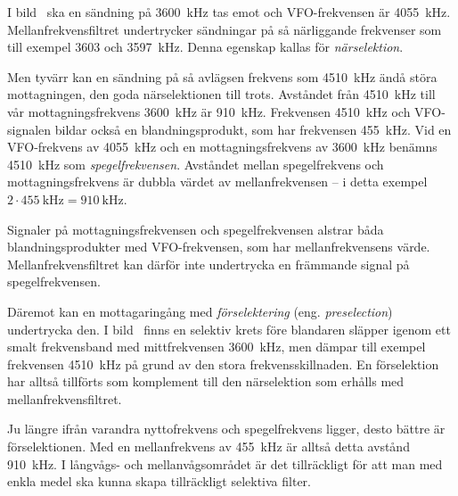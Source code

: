 \begin{exempelbox}
I bild~ ska en sändning på \qty{3600}{\kilo\hertz} tas
emot och VFO-frekvensen är \qty{4055}{\kilo\hertz}.
Mellanfrekvensfiltret undertrycker sändningar på så närliggande frekvenser
som till exempel 3603 och \qty{3597}{\kilo\hertz}.
Denna egenskap kallas för \emph{närselektion}.

Men tyvärr kan en sändning på så avlägsen frekvens som \qty{4510}{\kilo\hertz}
ändå störa mottagningen, den goda närselektionen till trots.
Avståndet från \qty{4510}{\kilo\hertz} till vår mottagningsfrekvens
\qty{3600}{\kilo\hertz} är \qty{910}{\kilo\hertz}.
Frekvensen \qty{4510}{\kilo\hertz} och VFO-signalen bildar också en
blandningsprodukt, som har frekvensen \qty{455}{\kilo\hertz}.
Vid en VFO-frekvens av \qty{4055}{\kilo\hertz} och en mottagningsfrekvens av
\qty{3600}{\kilo\hertz} benämns \qty{4510}{\kilo\hertz} som
\emph{spegelfrekvensen}.
Avståndet mellan spegelfrekvens och mottagningsfrekvens är dubbla värdet av
mellanfrekvensen -- i detta exempel \(2 \cdot \qty{455}{\kilo\hertz} =
\qty{910}{\kilo\hertz}\).
\end{exempelbox}

Signaler på mottagningsfrekvensen och spegelfrekvensen alstrar båda
blandningsprodukter med VFO-frekvensen, som har mellanfrekvensens värde.
Mellanfrekvensfiltret kan därför inte undertrycka en främmande signal på
spegelfrekvensen.


Däremot kan en mottagaringång med \emph{förselektering} (eng.
\emph{preselection}) undertrycka den.
I bild~ finns en selektiv krets före blandaren släpper
igenom ett smalt frekvensband med mittfrekvensen \qty{3600}{\kilo\hertz}, men
dämpar till exempel frekvensen \qty{4510}{\kilo\hertz} på grund av den stora
frekvensskillnaden.
En förselektion har alltså tillförts som komplement till den närselektion som
erhålls med mellanfrekvensfiltret.


Ju längre ifrån varandra nyttofrekvens och spegelfrekvens ligger, desto bättre
är förselektionen.
Med en mellanfrekvens av \qty{455}{\kilo\hertz} är alltså detta avstånd
\qty{910}{\kilo\hertz}.
I långvågs- och mellanvågsområdet är det tillräckligt för att man med enkla
medel ska kunna skapa tillräckligt selektiva filter.

